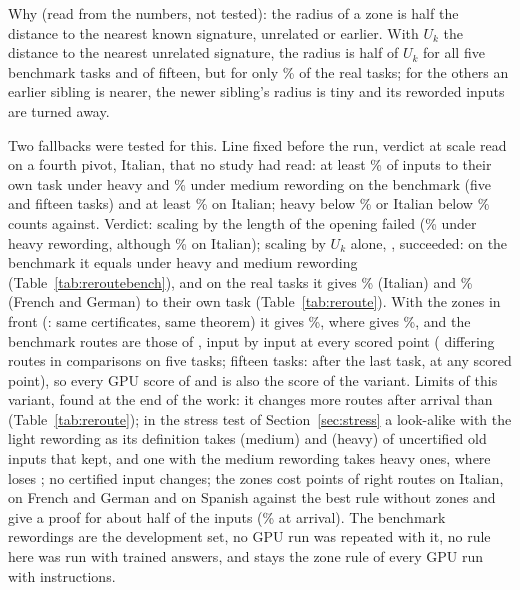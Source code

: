 Why (read from the numbers, not tested): the radius of a zone is half the distance to the nearest known signature, unrelated or earlier. With $U_k$ the distance to the nearest unrelated signature, the radius is half of $U_k$ for all five benchmark tasks and \RerouteBBenchFifteenCount{} of fifteen, but for only \RerouteBShare{}\% of the \WidenTasksEval{} real tasks; for the others an earlier sibling is nearer, the newer sibling's radius is tiny and its reworded inputs are turned away.

Two fallbacks were tested for this. Line fixed before the run, verdict at scale read on a fourth pivot, Italian, that no study had read: at least \RerouteLineHeavy{}\% of inputs to their own task under heavy and \RerouteLineMedium{}\% under medium rewording on the benchmark (five and fifteen tasks) and at least \RerouteLineItalian{}\% on Italian; heavy below \RerouteLineHeavyAgainst{}\% or Italian below \RerouteLineItalianAgainst{}\% counts against. Verdict: scaling by the length of the opening failed (\RerouteNormHeavyFive{}\% under heavy rewording, although \RerouteNormItOwn{}\% on Italian); scaling by $U_k$ alone, \scaled{}, succeeded: on the benchmark it equals \cert{} under heavy and medium rewording (Table~\ref{tab:reroutebench}), and on the real tasks it gives \RerouteBgItOwn{}\% (Italian) and \RerouteBgOwnEnd{}\% (French and German) to their own task (Table~\ref{tab:reroute}). With the zones in front (\certscaled{}: same certificates, same theorem) it gives \RerouteCertFourOwnEnd{}\%, where \cert{} gives \RerouteCertOwnEnd{}\%, and the benchmark routes are those of \cert{}, input by input at every scored point (\RerouteIdFiveLast{} differing routes in \RerouteIdFiveComparisons{} comparisons on five tasks; fifteen tasks: \RerouteIdFifteenLast{} after the last task, \RerouteIdFifteenScored{} at any scored point), so every GPU score of \cert{} and \nearest{} is also the score of the variant. Limits of this variant, found at the end of the work: it changes more routes after arrival than \cert{} (Table~\ref{tab:reroute}); in the stress test of Section~\ref{sec:stress} a look-alike with the light rewording as its definition takes \RerouteStressCertFourMedium{} (medium) and \RerouteStressCertFourHeavy{} (heavy) of \RerouteStressOld{} uncertified old inputs that \cert{} kept, and one with the medium rewording takes \RerouteStressMedCertFourHeavy{} heavy ones, where \cert{} loses \RerouteStressMedCertHeavy{}; no certified input changes; the zones cost \RerouteZonesCost{} points of right routes on Italian, \RerouteZonesCostFG{} on French and German and \RerouteZonesCostEs{} on Spanish against the best rule without zones and give a proof for about half of the inputs (\RerouteCertInZone{}\% at arrival). The benchmark rewordings are the development set, no GPU run was repeated with it, no rule here was run with trained answers, and \cert{} stays the zone rule of every GPU run with instructions.

